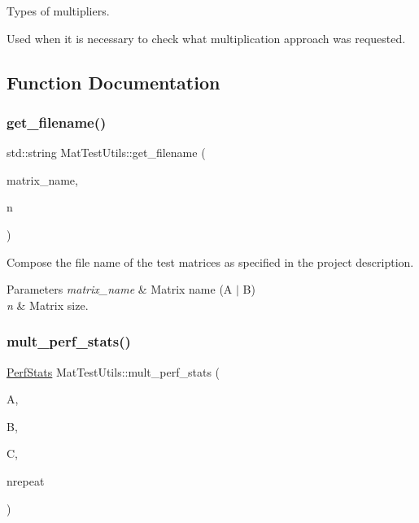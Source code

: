 Types of multipliers. 

Used when it is necessary to check what multiplication approach was requested. 

\subsection{Function Documentation}
\mbox{\label{namespaceMatTestUtils_a9e032c504f598952db985df790a0bcaa}} 
\subsubsection{\texorpdfstring{get\+\_\+filename()}{get\_filename()}}
{\footnotesize\ttfamily std\+::string Mat\+Test\+Utils\+::get\+\_\+filename (\begin{DoxyParamCaption}\item[{std\+::string}]{matrix\+\_\+name,  }\item[{int}]{n }\end{DoxyParamCaption})}



Compose the file name of the test matrices as specified in the project description. 


\begin{DoxyParams}{Parameters}
{\em matrix\+\_\+name} & Matrix name (A $\vert$ B) \\
\hline
{\em n} & Matrix size. \\
\hline
\end{DoxyParams}
\mbox{\label{namespaceMatTestUtils_acb8180416ec63f236bd49092434ce55e}} 
\subsubsection{\texorpdfstring{mult\+\_\+perf\+\_\+stats()}{mult\_perf\_stats()}}
{\footnotesize\ttfamily \mbox{\hyperlink{structMatTestUtils_1_1PerfStats}{Perf\+Stats}} Mat\+Test\+Utils\+::mult\+\_\+perf\+\_\+stats (\begin{DoxyParamCaption}\item[{const \mbox{\hyperlink{classMath_1_1Matrix}{Math\+::\+Matrix}}$<$ int $>$ \&}]{A,  }\item[{const \mbox{\hyperlink{classMath_1_1Matrix}{Math\+::\+Matrix}}$<$ int $>$ \&}]{B,  }\item[{\mbox{\hyperlink{classMath_1_1Matrix}{Math\+::\+Matrix}}$<$ int $>$ \&}]{C,  }\item[{const int \&}]{nrepeat }\end{DoxyParamCaption})}



